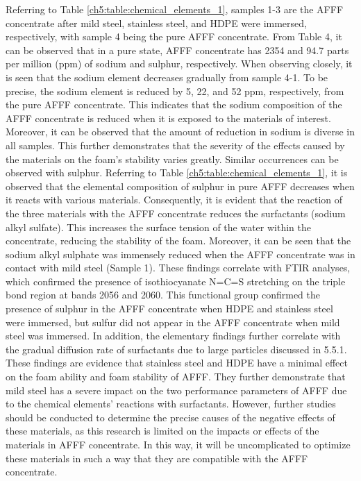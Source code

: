Referring to Table \ref{ch5:table:chemical_elements_1}, samples 1-3 are the AFFF concentrate after mild steel, stainless steel, and HDPE were immersed, respectively, with sample 4 being the pure AFFF concentrate. From Table 4, it can be observed that in a pure state, AFFF concentrate has 2354 and 94.7 parts per million (ppm) of sodium and sulphur, respectively. When observing closely, it is seen that the sodium element decreases gradually from sample 4-1. To be precise, the sodium element is reduced by 5, 22, and 52 ppm, respectively, from the pure AFFF concentrate. This indicates that the sodium composition of the AFFF concentrate is reduced when it is exposed to the materials of interest. Moreover, it can be observed that the amount of reduction in sodium is diverse in all samples. This further demonstrates that the severity of the effects caused by the materials on the foam’s stability varies greatly.
Similar occurrences can be observed with sulphur. Referring to Table \ref{ch5:table:chemical_elements_1}, it is observed that the elemental composition of sulphur in pure AFFF decreases when it reacts with various materials. Consequently, it is evident that the reaction of the three materials with the AFFF concentrate reduces the surfactants (sodium alkyl sulfate). This increases the surface tension of the water within the concentrate, reducing the stability of the foam. Moreover, it can be seen that the sodium alkyl sulphate was immensely reduced when the AFFF concentrate was in contact with mild steel (Sample 1). These findings correlate with FTIR analyses, which confirmed the presence of isothiocyanate N=C=S stretching on the triple bond region at bands 2056 and 2060. This functional group confirmed the presence of sulphur in the AFFF concentrate when HDPE and stainless steel were immersed, but sulfur did not appear in the AFFF concentrate when mild steel was immersed.
In addition, the elementary findings further correlate with the gradual diffusion rate of surfactants due to large particles discussed in 5.5.1. These findings are evidence that stainless steel and HDPE have a minimal effect on the foam ability and foam stability of AFFF. They further demonstrate that mild steel has a severe impact on the two performance parameters of AFFF due to the chemical elements’ reactions with surfactants. However, further studies should be conducted to determine the precise causes of the negative effects of these materials, as this research is limited on the impacts or effects of the materials in AFFF concentrate. In this way, it will be uncomplicated to optimize these materials in such a way that they are compatible with the AFFF concentrate.
